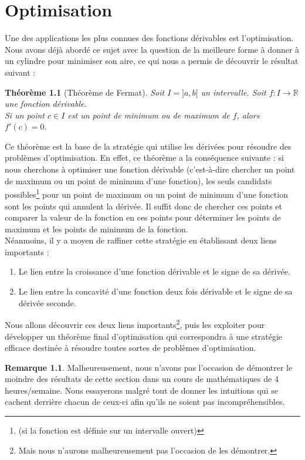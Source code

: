 \documentclass[a4paper,fontsize=13pt]{scrreprt}
\theoremstyle{plain}
\newtheorem{thé}[subsection]{Théorème}
\theoremstyle{definition}
\newtheorem{rema}[subsection]{Remarque}
\newcommand{\rr}{\mathbb{R}}
\begin{document}
\chapter{Optimisation} 
Une des applications les plus connues des fonctions dérivables est l'optimisation. Nous avons déjà abordé ce sujet avec la question de la meilleure forme à donner à un cylindre pour minimiser son aire, ce qui nous a permis de découvrir le résultat suivant :
\begin{thé} [Théorème de Fermat]
Soit $I = ]a,b[$ un intervalle. Soit $f : I \to \rr$ une fonction dérivable. \\
Si un point $c \in I$ est un point de minimum ou de maximum de $f$, alors $f'(c)=0$.
\end{thé}
Ce théorème est la base de la stratégie qui utilise les dérivées pour résoudre des problèmes d'optimisation. En effet, ce théorème a la conséquence suivante : si nous cherchons à optimiser une fonction dérivable (c'est-à-dire chercher un point de maximum ou un point de minimum d'une fonction), les seuls \og candidats \fg{} possibles\footnote{(si la fonction est définie sur un intervalle ouvert)} pour un point de maximum ou un point de minimum d'une fonction sont les points qui annulent la dérivée. Il suffit donc de chercher ces points et comparer la valeur de la fonction en ces points pour déterminer les points de maximum et les points de minimum de la fonction. \\
Néanmoins, il y a moyen de raffiner cette stratégie en établissant deux liens importants :
\begin{enumerate}
\item Le lien entre la croissance d'une fonction dérivable et le signe de sa dérivée.
\item Le lien entre la concavité d'une fonction deux fois dérivable et le signe de sa dérivée seconde.
\end{enumerate}
Nous allons découvrir ces deux liens importants\footnote{Mais nous n'aurons malheureusement pas l'occasion de les démontrer.}, puis les exploiter pour développer un \og théorème final d'optimisation \fg{} qui correspondra à une stratégie efficace destinée à résoudre toutes sortes de problèmes d'optimisation.
\begin{rema}
Malheureusement, nous n'avons pas l'occasion de démontrer le moindre des résultats de cette section dans un cours de mathématiques de $4$ heures/semaine. Nous essayerons malgré tout de donner les intuitions qui se cachent derrière chacun de ceux-ci afin qu'ils ne soient pas incompréhensibles.
\end{rema}
\end{document}
